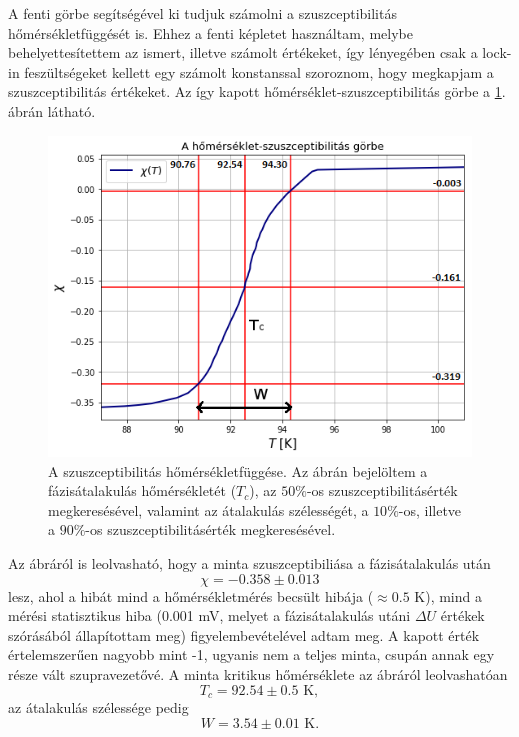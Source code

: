 \documentclass[12pt,a4paper]{article}
\begin{document}
\newpage
A fenti görbe segítségével ki tudjuk számolni a szuszceptibilitás hőmérsékletfüggését is. Ehhez a fenti képletet használtam, melybe behelyettesítettem az ismert, illetve számolt értékeket, így lényegében csak a lock-in feszültségeket kellett egy számolt konstanssal szoroznom, hogy megkapjam a szuszceptibilitás értékeket. Az így kapott hőmérséklet-szuszceptibilitás görbe a \ref{fig:7}. ábrán látható.\\
\begin{figure}[!h]
\centering
\hspace*{-1cm}
\includegraphics[scale=1.15]{szusz}
\caption{A szuszceptibilitás hőmérsékletfüggése. Az ábrán bejelöltem a fázisátalakulás hőmérsékletét ($T_c$), az $50\%$-os szuszceptibilitásérték megkeresésével, valamint az átalakulás szélességét, a $10\%$-os, illetve a $90\%$-os szuszceptibilitásérték megkeresésével.}
\label{fig:7}
\end{figure}
\newline
Az ábráról is leolvasható, hogy a minta szuszceptibiliása a fázisátalakulás után
$$\chi = -0.358 \pm 0.013 $$
lesz, ahol a hibát mind a hőmérsékletmérés becsült hibája ($\approx 0.5$ K), mind a mérési statisztikus hiba (0.001 mV, melyet a fázisátalakulás utáni $\Delta U$ értékek szórásából állapítottam meg) figyelembevételével adtam meg. A kapott érték értelemszerűen nagyobb mint -1, ugyanis nem a teljes minta, csupán annak egy része vált szupravezetővé. A minta kritikus hőmérséklete az ábráról leolvashatóan 
$$T_c=92.54 \pm 0.5 \textrm{ K},$$
az átalakulás szélessége pedig
$$W=3.54 \pm 0.01 \textrm{ K} .$$

\newpage
\end{document}
